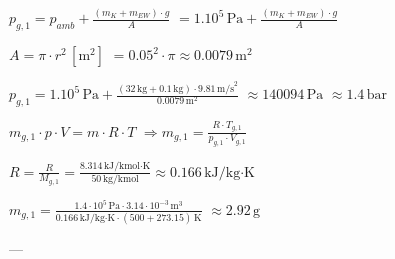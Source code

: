 \( p_{g,1} = p_{amb} + \frac{(m_K + m_{EW}) \cdot g}{A} \)  
\( = 1.10^5 \, \text{Pa} + \frac{(m_K + m_{EW}) \cdot g}{A} \)  

\( A = \pi \cdot r^2 \, [\text{m}^2] \)  
\( = 0.05^2 \cdot \pi \approx 0.0079 \, \text{m}^2 \)  

\( p_{g,1} = 1.10^5 \, \text{Pa} + \frac{(32 \, \text{kg} + 0.1 \, \text{kg}) \cdot 9.81 \, \text{m/s}^2}{0.0079 \, \text{m}^2} \)  
\( \approx 140094 \, \text{Pa} \)  
\( \approx 1.4 \, \text{bar} \)  

\( m_{g,1} \cdot p \cdot V = m \cdot R \cdot T \)  
\( \Rightarrow m_{g,1} = \frac{R \cdot T_{g,1}}{p_{g,1} \cdot V_{g,1}} \)  

\( R = \frac{R}{M_{g,1}} = \frac{8.314 \, \text{kJ/kmol·K}}{50 \, \text{kg/kmol}} \approx 0.166 \, \text{kJ/kg·K} \)  

\( m_{g,1} = \frac{1.4 \cdot 10^5 \, \text{Pa} \cdot 3.14 \cdot 10^{-3} \, \text{m}^3}{0.166 \, \text{kJ/kg·K} \cdot (500 + 273.15) \, \text{K}} \)  
\( \approx 2.92 \, \text{g} \)  

---